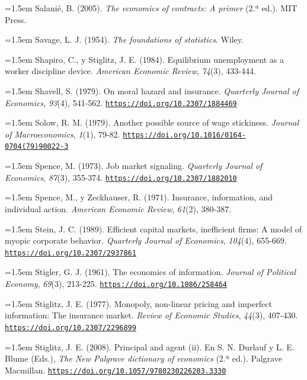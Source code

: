 \documentclass[10pt,a4paper]{article}
\begin{document}
\noindent\hangindent=1.5em Salanié, B. (2005). \textit{The economics of contracts: A primer} (2.ª ed.). MIT Press.

\noindent\hangindent=1.5em Savage, L. J. (1954). \textit{The foundations of statistics}. Wiley.

\noindent\hangindent=1.5em Shapiro, C., y Stiglitz, J. E. (1984). Equilibrium unemployment as a worker discipline device. \textit{American Economic Review}, \textit{74}(3), 433-444.

\noindent\hangindent=1.5em Shavell, S. (1979). On moral hazard and insurance. \textit{Quarterly Journal of Economics}, \textit{93}(4), 541-562. \href{https://doi.org/10.2307/1884469}{\nolinkurl{https://doi.org/10.2307/1884469}}

\noindent\hangindent=1.5em Solow, R. M. (1979). Another possible source of wage stickiness. \textit{Journal of Macroeconomics}, \textit{1}(1), 79-82. \href{https://doi.org/10.1016/0164-0704(79)90022-3}{\nolinkurl{https://doi.org/10.1016/0164-0704(79)90022-3}}

\noindent\hangindent=1.5em Spence, M. (1973). Job market signaling. \textit{Quarterly Journal of Economics}, \textit{87}(3), 355-374. \href{https://doi.org/10.2307/1882010}{\nolinkurl{https://doi.org/10.2307/1882010}}

\noindent\hangindent=1.5em Spence, M., y Zeckhauser, R. (1971). Insurance, information, and individual action. \textit{American Economic Review}, \textit{61}(2), 380-387.

\noindent\hangindent=1.5em Stein, J. C. (1989). Efficient capital markets, inefficient firms: A model of myopic corporate behavior. \textit{Quarterly Journal of Economics}, \textit{104}(4), 655-669. \href{https://doi.org/10.2307/2937861}{\nolinkurl{https://doi.org/10.2307/2937861}}

\noindent\hangindent=1.5em Stigler, G. J. (1961). The economics of information. \textit{Journal of Political Economy}, \textit{69}(3), 213-225. \href{https://doi.org/10.1086/258464}{\nolinkurl{https://doi.org/10.1086/258464}}

\noindent\hangindent=1.5em Stiglitz, J. E. (1977). Monopoly, non-linear pricing and imperfect information: The insurance market. \textit{Review of Economic Studies}, \textit{44}(3), 407-430. \href{https://doi.org/10.2307/2296899}{\nolinkurl{https://doi.org/10.2307/2296899}}

\noindent\hangindent=1.5em Stiglitz, J. E. (2008). Principal and agent (ii). En S. N. Durlauf y L. E. Blume (Eds.), \textit{The New Palgrave dictionary of economics} (2.ª ed.). Palgrave Macmillan. \href{https://doi.org/10.1057/9780230226203.3330}{\nolinkurl{https://doi.org/10.1057/9780230226203.3330}}
\end{document}
